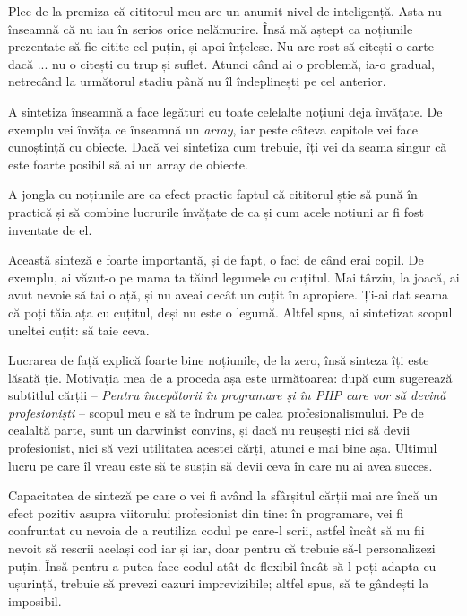 Plec de la premiza că cititorul meu are un anumit nivel de inteligență.
Asta nu înseamnă că nu iau în serios orice nelămurire. Însă mă aștept
ca noțiunile prezentate să fie citite cel puțin, și apoi înțelese.
Nu are rost să citești o carte dacă ... nu o citești cu trup și suflet.
Atunci când ai o problemă, ia-o gradual, netrecând la următorul stadiu
până nu îl îndeplinești pe cel anterior.


A sintetiza înseamnă a face legături cu toate celelalte noțiuni
deja învățate. De exemplu vei învăța ce înseamnă un \textsl{array}, iar peste
câteva capitole vei face cunoștință cu obiecte. Dacă vei sintetiza
cum trebuie, îți vei da seama singur că este foarte posibil
să ai un array de obiecte.

A jongla cu noțiunile are ca efect practic faptul că cititorul știe
să pună în practică și să combine lucrurile învățate de ca și cum
acele noțiuni ar fi fost inventate de el.


Această sinteză e foarte importantă, și de fapt, o faci de când erai
copil. De exemplu, ai văzut-o pe mama ta tăind legumele cu cuțitul.
Mai târziu, la joacă, ai avut nevoie să tai o ață, și nu aveai decât
un cuțit în apropiere. Ți-ai dat seama că poți tăia ața cu cuțitul,
deși nu este o legumă. Altfel spus, ai sintetizat scopul uneltei
{\glqq}cuțit{\grqq}: să taie ceva.

Lucrarea de față explică foarte bine noțiunile, de la zero, însă
sinteza îți este lăsată ție. Motivația mea de a proceda așa este următoarea:
după cum sugerează subtitlul cărții -- \textit{Pentru începătorii în programare și în PHP care vor să devină profesioniști} -- scopul meu e să te îndrum pe calea profesionalismului.
Pe de cealaltă parte, sunt un darwinist convins, și dacă nu reușești
nici să devii profesionist, nici să vezi utilitatea acestei cărți, atunci
e mai bine așa. Ultimul lucru pe care îl vreau este să te susțin
să devii ceva în care nu ai avea succes.

Capacitatea de sinteză pe care o vei fi având la sfârșitul cărții
mai are încă un efect pozitiv asupra viitorului profesionist din tine:
în programare, vei fi confruntat cu nevoia de a reutiliza codul pe care-l scrii, astfel
încât să nu fii nevoit să rescrii același cod iar și iar, doar pentru
că trebuie să-l personalizezi puțin. Însă pentru a putea face
codul atât de flexibil încât să-l poți adapta cu ușurință, trebuie
să prevezi cazuri {\glqq}imprevizibile{\grqq}; altfel spus, să te gândești
la imposibil.

